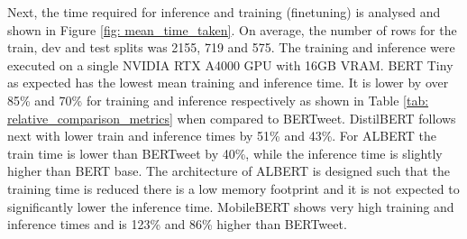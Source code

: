Next, the time required for inference and training (finetuning) is analysed and shown in Figure \ref{fig: mean_time_taken}. On average, the number of rows for the train, dev and test splits was 2155, 719 and 575. The training and inference were executed on a single NVIDIA RTX A4000 GPU with 16GB VRAM. BERT Tiny as expected has the lowest mean training and inference time. It is lower by over 85\% and 70\% for training and inference respectively as shown in Table \ref{tab: relative_comparison_metrics} when compared to BERTweet. DistilBERT follows next with lower train and inference times by 51\% and 43\%. For ALBERT the train time is lower than BERTweet by 40\%, while the inference time is slightly higher than BERT base. The architecture of ALBERT is designed such that the training time is reduced there is a low memory footprint and it is not expected to significantly lower the inference time. MobileBERT shows very high training and inference times and is 123\% and 86\% higher than BERTweet.
